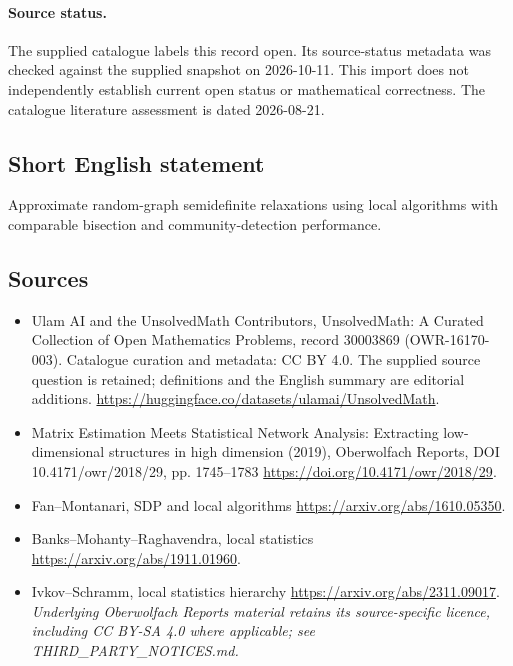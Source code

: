 \documentclass[11pt]{article}
\begin{document}
\paragraph{Source status.}
The supplied catalogue labels this record open. Its source-status metadata was checked against the supplied snapshot on 2026-10-11. This import does not independently establish current open status or mathematical correctness. The catalogue literature assessment is dated 2026-08-21.
\subsection{Short English statement}
Approximate random-graph semidefinite relaxations using local algorithms with comparable bisection and community-detection performance.
\subsection{Sources}
\begin{itemize}
\item[\hypertarget{source:30003869:1}{S1}] Ulam AI and the UnsolvedMath Contributors, UnsolvedMath: A Curated Collection of Open Mathematics Problems, record 30003869 (OWR-16170-003). Catalogue curation and metadata: CC BY 4.0. The supplied source question is retained; definitions and the English summary are editorial additions.
\url{https://huggingface.co/datasets/ulamai/UnsolvedMath}.
\item[\hypertarget{source:30003869:2}{S2}] Matrix Estimation Meets Statistical Network Analysis: Extracting low-dimensional structures in high dimension (2019), Oberwolfach Reports, DOI 10.4171/owr/2018/29, pp. 1745--1783
\url{https://doi.org/10.4171/owr/2018/29}.
\item[\hypertarget{source:30003869:3}{S3}] Fan--Montanari, SDP and local algorithms
\url{https://arxiv.org/abs/1610.05350}.
\item[\hypertarget{source:30003869:4}{S4}] Banks--Mohanty--Raghavendra, local statistics
\url{https://arxiv.org/abs/1911.01960}.
\item[\hypertarget{source:30003869:5}{S5}] Ivkov--Schramm, local statistics hierarchy
\url{https://arxiv.org/abs/2311.09017}.
\textit{Underlying Oberwolfach Reports material retains its source-specific licence, including CC BY-SA 4.0 where applicable; see THIRD\_PARTY\_NOTICES.md.}
\end{itemize}
\end{document}
